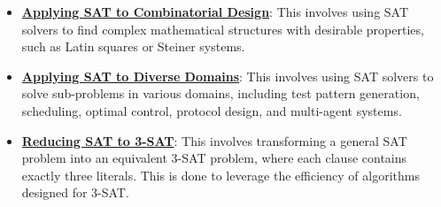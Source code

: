 \documentclass{article}%
\begin{document}
\begin{itemize}[leftmargin=*]
\item \href{https://purdue.brightspace.com/d2l/common/assets/pdfjs-d2l-dist/1.0.14-legacy/web/viewer.html?file=%2Fcontent%2Fenforced%2F1095467-wl.202510.CS.24300.001%2F13L1-Logic.pdf%3Fou%3D1095467&lang=en-us&container=d2l-fileviewer-rendered-pdf&fullscreen=d2l-fileviewer-rendered-pdf-dialog&height=667#page=22}{\textbf{Applying SAT to Combinatorial Design}}: This involves using SAT solvers to find complex mathematical structures with desirable properties, such as Latin squares or Steiner systems.%
\item \href{https://purdue.brightspace.com/d2l/common/assets/pdfjs-d2l-dist/1.0.14-legacy/web/viewer.html?file=%2Fcontent%2Fenforced%2F1095467-wl.202510.CS.24300.001%2F13L1-Logic.pdf%3Fou%3D1095467&lang=en-us&container=d2l-fileviewer-rendered-pdf&fullscreen=d2l-fileviewer-rendered-pdf-dialog&height=667#page=23}{\textbf{Applying SAT to Diverse Domains}}: This involves using SAT solvers to solve sub-problems in various domains, including test pattern generation, scheduling, optimal control, protocol design, and multi-agent systems.%
\item \href{https://purdue.brightspace.com/d2l/common/assets/pdfjs-d2l-dist/1.0.14-legacy/web/viewer.html?file=%2Fcontent%2Fenforced%2F1095467-wl.202510.CS.24300.001%2F13L1-Logic.pdf%3Fou%3D1095467&lang=en-us&container=d2l-fileviewer-rendered-pdf&fullscreen=d2l-fileviewer-rendered-pdf-dialog&height=667#page=24}{\textbf{Reducing SAT to 3{-}SAT}}: This involves transforming a general SAT problem into an equivalent 3-SAT problem, where each clause contains exactly three literals. This is done to leverage the efficiency of algorithms designed for 3-SAT.%
\end{itemize}%
\end{document}

